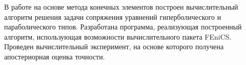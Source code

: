 \newpage

\begin{center}
\end{center}

В работе на основе метода конечных элементов построен вычислительный алгоритм решения задачи 
сопряжения уравнений гиперболического и параболического типов. Разработана программа, реализующая
построенный алгоритм, использующая возможности вычислительного пакета FEniCS. Проведен вычислительный 
эксперимент, на основе которого получена апостериорная оценка точности.

\newpage
